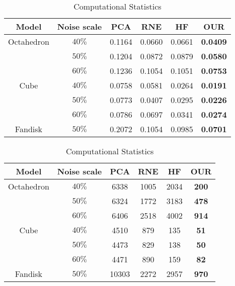 \begin{table}
  \centering
  \caption{\label{tab:quantitative} Computational Statistics}
    \begin{tabular}{|c|c|c|c|c|c|}
      \hline
  Model&Noise scale&PCA&RNE&HF&OUR
    \\\hline\hline
    Octahedron & $40\%$& 0.1164 & 0.0660 & 0.0661 & \textbf{0.0409}
    \\\hline
     & $50\%$& 0.1204 & 0.0872 & 0.0879 & \textbf{0.0580}
    \\\hline
     & $60\%$& 0.1236 & 0.1054 & 0.1051 & \textbf{0.0753}
    \\\hline
     Cube & $40\%$ & 0.0758 & 0.0581 & 0.0264 & \textbf{0.0191}
    \\\hline
     & $50\%$& 0.0773 & 0.0407 & 0.0295 & \textbf{0.0226}
    \\\hline
     & $60\%$& 0.0786 & 0.0697 & 0.0341 & \textbf{0.0274}
    \\\hline
     Fandisk & $50\%$& 0.2072 & 0.1054 & 0.0985 & \textbf{0.0701}
    \\\hline
      \end{tabular}
\end{table}

\begin{table}
  \centering
  \caption{\label{tab:time} Computational Statistics}
    \begin{tabular}{|c|c|c|c|c|c|}
      \hline
  Model&Noise scale& PCA & RNE & HF & OUR
    \\\hline\hline
    Octahedron & $40\%$& 6338 & 1005 & 2034 & \textbf{200}
    \\\hline
     & $50\%$& 6324 & 1772 & 3183 & \textbf{478}
    \\\hline
     & $60\%$& 6406 & 2518 & 4002 & \textbf{914}
     \\\hline
    Cube & $40\%$ & 4510 & 879 & 135 & \textbf{51}
    \\\hline
     & $50\%$& 4473 & 829 & 138 & \textbf{50}
    \\\hline
     & $60\%$& 4471 & 890 & 159 & \textbf{82}
    \\\hline
    Fandisk & $50\%$& 10303 & 2272 & 2957 & \textbf{970}
    \\\hline
      \end{tabular}
\end{table}